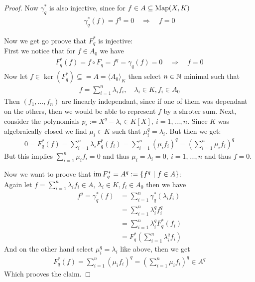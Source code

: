 \documentclass[]{article}
\begin{document}
\begin{proof}
    Now \(\gamma_q^*\) is also injective, since for \(f \in A \subseteq \operatorname{Map}(X,K)\)
    \begin{align*}
        \gamma_q^*(f)=f^q=0 \quad \Longrightarrow \quad f = 0
    \end{align*}

    Now we get go proove that \(F_q^*\) is injective: \\
    First we notice that for \(f \in A_0\) we have
    \begin{align*}
        F_q^*(f)= f \circ F_q = f^q = \gamma_q(f) = 0 \quad \Longrightarrow \quad f = 0
    \end{align*}
    Now let \(f \in \ker(F_q^*) \subseteq = A = \langle A_0 \rangle_K\) then select \(n \in {\mathbb{N}}\) minimal such that
    \begin{align*}
        f = \sum_{i=1}^{n} \lambda_i f_i, \quad \lambda_i \in K, f_i \in A_0
    \end{align*}
    Then \((f_1, \dots, f_n)\) are linearly independant, since if one of them was dependant on the others, then we would be able to
    represent \(f\) by a shroter sum. Next, consider the polynomials \(p_i:=X^q-\lambda_i \in K[X], \ i=1, \dots, n \). 
    Since \(K\) was algebraically closed we find \(\mu_i \in K\) such that \(\mu_i^q=\lambda_i\). But then we get:
    \begin{align*}
        0 = F_q^*(f)=\sum_{i=1}^{n} \lambda_i F_q^*(f_i) = \sum_{i=1}^{n} (\mu_i f_i)^q = \left( \sum_{i=1}^{n} \mu_i f_i \right)^q
    \end{align*}
    But this implies \(\sum_{i=1}^{n} \mu_i f_i = 0\) and thus \(\mu_i = \lambda_i = 0, \ i=1, \dots, n\) and thus \(f=0\).

    Now we want to proove that \(\operatorname{im} F_q^* = A^q:=\{f^q \ | \ f \in A\}\):\\
    Again let \(f = \sum_{i=1}^{n} \lambda_i f_i \in A, \ \lambda_i \in K, f_i \in A_0\) then we have
    \begin{align*}
        f^q = \gamma_q^*(f)&=\sum_{i=1}^{n} \gamma_q^*(\lambda_i f_i) \\
        &=\sum_{i=1}^{n} \lambda_i^q f_i^q \\
        &=\sum_{i=1}^{n} \lambda_i^q F_q^*(f_i) \\
        &=F_q^*\left(\sum_{i=1}^{n} \lambda_i^q f_i\right)
    \end{align*}
    And on the other hand select \(\mu_i^q=\lambda_i\) like above, then we get
    \begin{align*}
        F_q^*(f) = \sum_{i=1}^{n} (\mu_i f_i)^q = \left( \sum_{i=1}^{n} \mu_i f_i \right)^q \in A^q 
    \end{align*}
    Which prooves the claim. 


\end{proof}
\end{document}
